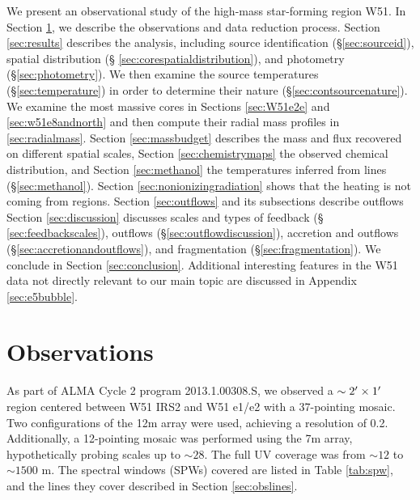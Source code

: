 \documentclass{emulateapj}
\begin{document}
 We present an
observational study of the high-mass star-forming region W51.  In Section
\ref{sec:observations}, we describe the observations and data reduction
process.  Section \ref{sec:results} describes the analysis, including source
identification (\S \ref{sec:sourceid}), spatial distribution (\S
\ref{sec:corespatialdistribution}), and photometry (\S \ref{sec:photometry}).
We then examine the source temperatures (\S \ref{sec:temperature}) in order to
determine their nature (\S \ref{sec:contsourcenature}).  We examine the most
massive cores in Sections \ref{sec:W51e2e} and \ref{sec:w51e8andnorth} and then
compute their radial mass profiles in \ref{sec:radialmass}.
Section \ref{sec:massbudget} describes the mass and flux recovered on different
spatial scales,
Section \ref{sec:chemistrymaps}  the observed chemical distribution, and
Section \ref{sec:methanol} the
temperatures inferred from \methanol lines (\S \ref{sec:methanol}).
Section \ref{sec:nonionizingradiation} shows that the heating is not coming
from \hii regions.
Section \ref{sec:outflows} and its subsections describe outflows 
Section \ref{sec:discussion} discusses scales and types of feedback (\S
\ref{sec:feedbackscales}), outflows (\S \ref{sec:outflowdiscussion}),
accretion and outflows (\S \ref{sec:accretionandoutflows}),
and fragmentation (\S \ref{sec:fragmentation}).  
We conclude in Section \ref{sec:conclusion}.
Additional interesting features in the W51 data not directly relevant
to our main topic are discussed in Appendix \ref{sec:e5bubble}.







\section{Observations}
\label{sec:observations}
As part of ALMA Cycle 2 program 2013.1.00308.S, we observed a
$\sim2\mbox{$^\prime$}\times1\mbox{$^\prime$}$ region centered between W51 IRS2 and W51 e1/e2
with a 37-pointing mosaic.  Two configurations of the 12m array were used,
achieving a resolution of 0.2\arcsec.  Additionally, a 12-pointing mosaic was
performed using the 7m array, hypothetically probing scales up to
$\sim28$\arcsec.  The full UV coverage was from $\sim12$ to $\sim1500$ m.
The spectral windows (SPWs) covered are listed in Table \ref{tab:spw},
and the lines they cover described in Section \ref{sec:obslines}.
\end{document}
